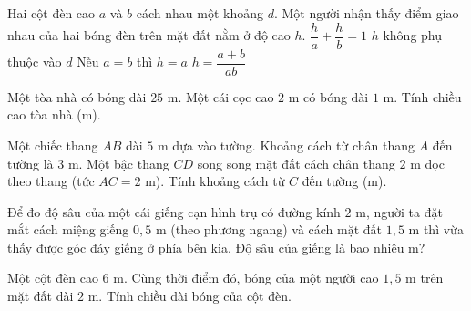 \begin{ex}%
	Hai cột đèn cao $a$ và $b$ cách nhau một khoảng $d$. Một người nhận thấy điểm giao nhau của hai bóng đèn trên mặt đất nằm ở độ cao $h$.
	\choiceTF
	{\True $\dfrac{h}{a} + \dfrac{h}{b} = 1$}
	{\True $h$ không phụ thuộc vào $d$}
	{Nếu $a=b$ thì $h=a$}
	{$h = \dfrac{a+b}{ab}$}
\end{ex}

\begin{bt}%
	Một tòa nhà có bóng dài $25\text{ m}$. Một cái cọc cao $2\text{ m}$ có bóng dài $1\text{ m}$. Tính chiều cao tòa nhà (m).
\end{bt}

\begin{bt}%
	Một chiếc thang $AB$ dài $5\text{ m}$ dựa vào tường. Khoảng cách từ chân thang $A$ đến tường là $3\text{ m}$. Một bậc thang $CD$ song song mặt đất cách chân thang $2\text{ m}$ dọc theo thang (tức $AC=2\text{ m}$). Tính khoảng cách từ $C$ đến tường (m).
\end{bt}

\begin{bt}%
	Để đo độ sâu của một cái giếng cạn hình trụ có đường kính $2\text{ m}$, người ta đặt mắt cách miệng giếng $0{,}5\text{ m}$ (theo phương ngang) và cách mặt đất $1{,}5\text{ m}$ thì vừa thấy được góc đáy giếng ở phía bên kia. Độ sâu của giếng là bao nhiêu m?
\end{bt}

\begin{bt}%
	Một cột đèn cao $6\text{ m}$. Cùng thời điểm đó, bóng của một người cao $1{,}5\text{ m}$ trên mặt đất dài $2\text{ m}$. Tính chiều dài bóng của cột đèn.
\end{bt}

